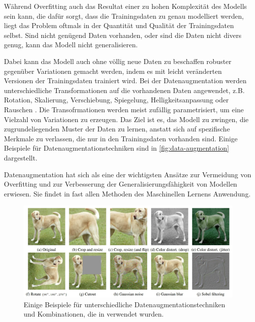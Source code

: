 Während Overfitting auch das Resultat einer zu hohen Komplexität des Modells sein kann, die dafür sorgt, dass die Trainingsdaten zu genau modelliert werden, liegt das Problem oftmals in der Quantität und Qualität der Trainingsdaten selbst. Sind nicht genügend Daten vorhanden, oder sind die Daten nicht divers genug, kann das Modell nicht generalisieren.

Dabei kann das Modell auch ohne völlig neue Daten zu beschaffen robuster gegenüber Variationen gemacht werden, indem es mit leicht veränderten Versionen der Trainingsdaten trainiert wird. Bei der Datenaugmentation werden unterschiedliche Transformationen auf die vorhandenen Daten angewendet, z.B. Rotation, Skalierung, Verschiebung, Spiegelung, Helligkeitsanpassung oder Rauschen \parencite{Shorten2019dataaugmentation}. Die Transofrmationen werden meist zufällig parametrisiert, um eine Vielzahl von Variationen zu erzeugen. Das Ziel ist es, das Modell zu zwingen, die zugrundeliegenden Muster der Daten zu lernen, anstatt sich auf spezifische Merkmale zu verlassen, die nur in den Trainingsdaten vorhanden sind. Einige Beispiele für Datenaugmentationstechniken sind in \autoref{fig:data-augmentation} dargestellt.

Datenaugmentation hat sich als eine der wichtigsten Ansätze zur Vermeidung von Overfitting und zur Verbesserung der Generalisierungsfähigkeit von Modellen erwiesen. Sie findet in fast allen Methoden des Maschinellen Lernens Anwendung.

\begin{figure}[t]
	\centering
	\includegraphics[width=\textwidth]{figure_data_augmentation.png}
	\caption{Einige Beispiele für unterschiedliche Datenaugmentationstechniken\\
	und Kombinationen, die in \parencite{Chen2020simclr} verwendet wurden.}
	\label{fig:data-augmentation}
\end{figure}

